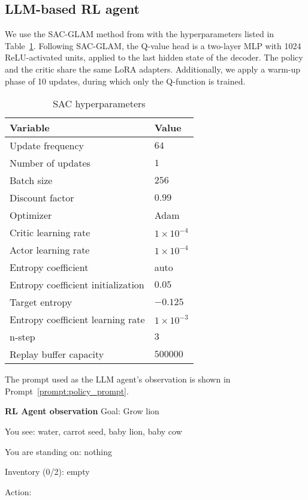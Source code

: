 \subsection{LLM-based RL agent}\label{app:implementation_details_sac_glam}
We use the SAC-GLAM method from \cite{gaven2024sacglam} with the hyperparameters listed in Table~\ref{tab:sac_param}. Following SAC-GLAM, the Q-value head is a two-layer MLP with 1024 ReLU-activated units, applied to the last hidden state of the decoder. The policy and the critic share the same LoRA adapters. Additionally, we apply a warm-up phase of 10 updates, during which only the Q-function is trained.

\begin{table}[!ht]
    \caption{SAC hyperparameters}
    \centering 
    \begin{tabular}{ll}
    \toprule
    \textbf{Variable} & \textbf{Value} \\
    \midrule
    Update frequency & $64$ \\
    Number of updates & $1$ \\
    Batch size & $256$ \\
    Discount factor & $0.99$ \\
    Optimizer & Adam \\
    Critic learning rate & $1 \times 10^{-4}$ \\
    Actor learning rate & $1 \times 10^{-4}$ \\
    Entropy coefficient & auto \\
    Entropy coefficient initialization & $0.05$ \\
    Target entropy & $-0.125$ \\
    Entropy coefficient learning rate & $1 \times 10^{-3}$ \\
    n-step & $3$ \\
    Replay buffer capacity & $500000$ \\
    \bottomrule
    \end{tabular}
    \label{tab:sac_param}
\end{table}

The prompt used as the LLM agent's observation is shown in Prompt~\ref{prompt:policy_prompt}.

\begin{promptbox_policy}{\textbf{RL Agent observation}} \label{prompt:policy_prompt}
Goal: Grow lion

You see: water, carrot seed, baby lion, baby cow

You are standing on: nothing

Inventory (0/2): empty

Action: 
\end{promptbox_policy}


